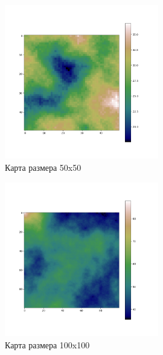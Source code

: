 \documentclass{article}
\numberwithin{equation}{section}
\begin{document}
			\begin{figure}[H]
				\centering
				\vspace{-0.5cm}
				\includegraphics[width=0.6\textwidth]{data/maps_example/50x50.png}
				\vspace{-0.5cm}
				\caption{Карта размера 50x50}\label{fig:map50}
			\end{figure}

			\begin{figure}[H]
				\centering
				\vspace{-0.5cm}
				\includegraphics[width=0.6\textwidth]{data/maps_example/100x100.png}
				\vspace{-0.5cm}
				\caption{Карта размера 100x100}\label{fig:map100}
			\end{figure}
\end{document}
